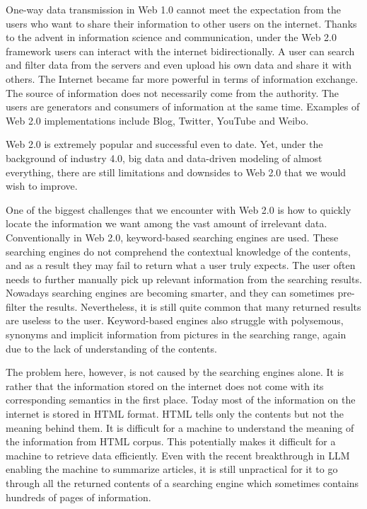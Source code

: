 One-way data transmission in Web 1.0 cannot meet the expectation from the users who want to share their information to other users on the internet. Thanks to the advent in information science and communication, under the Web 2.0 framework users can interact with the internet bidirectionally. A user can search and filter data from the servers and even upload his own data and share it with others. The Internet became far more powerful in terms of information exchange. The source of information does not necessarily come from the authority. The users are generators and consumers of information at the same time. Examples of Web 2.0 implementations include Blog, Twitter, YouTube and Weibo.

Web 2.0 is extremely popular and successful even to date. Yet, under the background of industry 4.0, big data and data-driven modeling of almost everything, there are still limitations and downsides to Web 2.0 that we would wish to improve.

One of the biggest challenges that we encounter with Web 2.0 is how to quickly locate the information we want among the vast amount of irrelevant data. Conventionally in Web 2.0, keyword-based searching engines are used. These searching engines do not comprehend the contextual knowledge of the contents, and as a result they may fail to return what a user truly expects. The user often needs to further manually pick up relevant information from the searching results. Nowadays searching engines are becoming smarter, and they can sometimes pre-filter the results. Nevertheless, it is still quite common that many returned results are useless to the user. Keyword-based engines also struggle with polysemous, synonyms and implicit information from pictures in the searching range, again due to the lack of understanding of the contents.

The problem here, however, is not caused by the searching engines alone.  It is rather that the information stored on the internet does not come with its corresponding semantics in the first place. Today most of the information on the internet is stored in HTML format. HTML tells only the contents but not the meaning behind them. It is difficult for a machine to understand the meaning of the information from HTML corpus. This potentially makes it difficult for a machine to retrieve data efficiently. Even with the recent breakthrough in LLM enabling the machine to summarize articles, it is still unpractical for it to go through all the returned contents of a searching engine which sometimes contains hundreds of pages of information.

